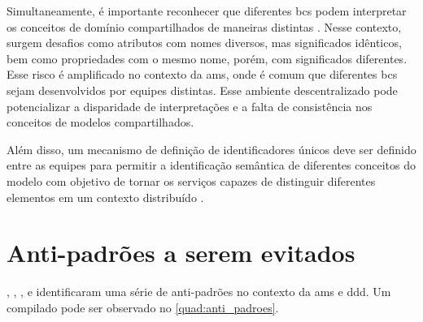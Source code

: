 Simultaneamente, é importante reconhecer que diferentes \acrshort{bc}s podem interpretar os conceitos de domínio compartilhados de maneiras distintas \cite{Diepenbrock20171777}. Nesse contexto, surgem desafios como atributos com nomes diversos, mas significados idênticos, bem como propriedades com o mesmo nome, porém, com significados diferentes. Esse risco é amplificado no contexto da \acrshort{ams}, onde é comum que diferentes \acrshort{bc}s sejam desenvolvidos por equipes distintas. Esse ambiente descentralizado pode potencializar a disparidade de interpretações e a falta de consistência nos conceitos de modelos compartilhados.

Além disso, um mecanismo de definição de identificadores únicos deve ser definido entre as equipes para permitir a identificação semântica de diferentes conceitos do modelo com objetivo de tornar os serviços capazes de distinguir diferentes elementos em um contexto distribuído \cite{Diepenbrock20171777}.

\section{Anti-padrões a serem evitados}
, , ,  e  identificaram uma série de anti-padrões no contexto da \acrshort{ams} e \acrshort{ddd}. Um compilado pode ser observado no \autoref{quad:anti_padroes}.

